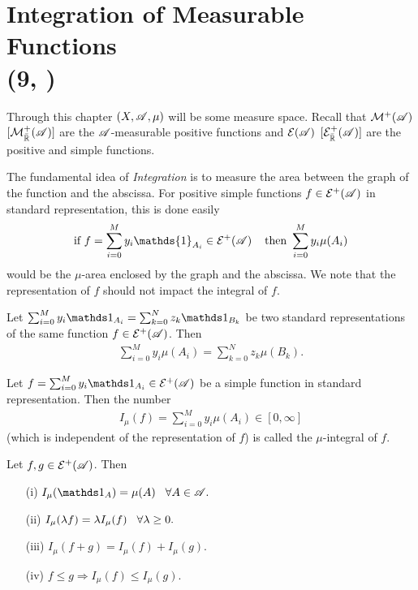 \section{Integration of Measurable Functions \protect\\ \tiny{ (9, \cite{schilling2017measures})}}
Through this chapter $(X,\mathscr{A},\mu)$ will be some measure space. Recall that $\mathcal M^+(\mathscr{A})$
$[\mathcal M^+_{\bar{\mathbb{R}}}(\mathscr{A})]$ are the
$\mathscr{A}$-measurable positive functions and $\mathcal E(\mathscr{A})$ $[\mathcal E^+_{\bar{\mathbb{R}}}(\mathscr{A})]$ are the positive and simple functions.

The fundamental idea of \textit{Integration} is to measure the area between the graph
of the function and the abscissa. For positive simple functions $f\in\mathcal E^+(\mathscr{A})$ in standard 
representation, this is done easily
\begin{align}
    \text{if  } f=\sum_{i=0}^M y_i \mathds{1}_{A_i}\in \E^+(\A)\hspace{4mm} \text{then  } \sum_{i=0}^{M}y_i\mu(A_i)
\end{align}
would be the $\mu$-area enclosed by the graph and the abscissa. We note that 
the representation of $f$ should not impact the integral of $f$.

\begin{lemma}
    Let $\sum_{i=0}^{M} y_i\one_{A_i} =\sum_{k=0}^{N} z_k\one_{B_k} $ be two standard representations
    of the same function $f\in\mathcal{E}^+(\mathscr{A})$. Then 
    \begin{align}
        \sum_{i=0}^{M} y_i\mu(A_i) =\sum_{k=0}^{N} z_k\mu(B_k).
    \end{align}
\end{lemma}


\begin{definition}
    Let $f=\sum_{i=0}^{M} y_i\one_{A_i}\in\E^+(\A)$ be a simple function in standard representation.
    Then the number
    \begin{align}
    I_\mu(f) = \sum_{i=0}^{M} y_i\mu(A_i)\in[0,\infty]    
    \end{align}
    (which is independent of the representation of $f$) is called the $\mu$-integral of $f$.
\end{definition}

\begin{proposition}
    Let $f,g\in\mathcal{E}^+(\mathscr{A})$. Then
    \begin{enumerate}
        \item[(i)] $I_\mu(\one_A)=\mu(A)\hspace{3mm}\forall A\in\A.$
        \item[(ii)] $I_\mu(\lambda f)=\lambda I_\mu(f)\hspace{3mm} \forall \lambda\geq 0.$
        \item[(iii)] $I_\mu(f+g) = I_\mu(f)+I_\mu(g).$
        \item[(iv)]  $f\leq g\Rightarrow I_\mu(f)\leq I_\mu(g).$
    \end{enumerate}
\end{proposition}

